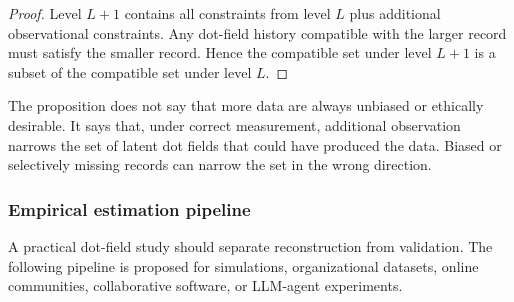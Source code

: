 \documentclass[11pt]{article}
\theoremstyle{remark}
\begin{document}
\begin{proof}
Level $L+1$ contains all constraints from level $L$ plus additional
observational constraints. Any dot-field history compatible with the
larger record must satisfy the smaller record. Hence the compatible set
under level $L+1$ is a subset of the compatible set under level $L$.
\end{proof}

The proposition does not say that more data are always unbiased or
ethically desirable. It says that, under correct measurement, additional
observation narrows the set of latent dot fields that could have
produced the data. Biased or selectively missing records can narrow the
set in the wrong direction.

\subsubsection{Empirical estimation pipeline}\label{empirical-estimation-pipeline}

A practical dot-field study should separate reconstruction from
validation. The following pipeline is proposed for simulations,
organizational datasets, online communities, collaborative software, or
LLM-agent experiments.
\end{document}
